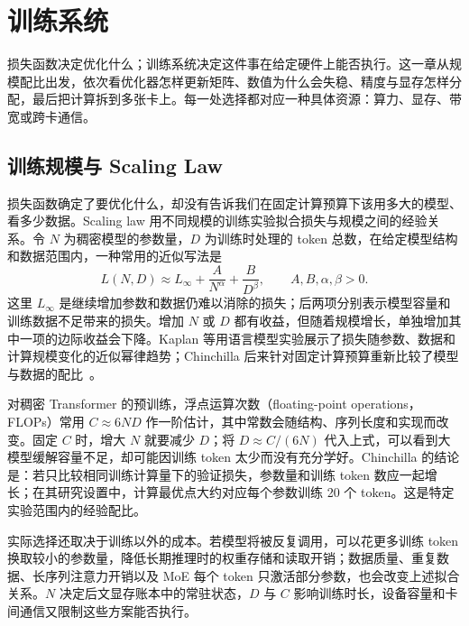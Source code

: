 \chapter{训练系统}
\label{chap:training-stability}

\begin{keybox}
损失函数决定优化什么；训练系统决定这件事在给定硬件上能否执行。这一章从规模配比出发，依次看优化器怎样更新矩阵、数值为什么会失稳、精度与显存怎样分配，最后把计算拆到多张卡上。每一处选择都对应一种具体资源：算力、显存、带宽或跨卡通信。
\end{keybox}

\section{训练规模与 Scaling Law}
\label{sec:training-scaling}

损失函数确定了要优化什么，却没有告诉我们在固定计算预算下该用多大的模型、看多少数据。Scaling law 用不同规模的训练实验拟合损失与规模之间的经验关系。令 \(N\) 为稠密模型的参数量，\(D\) 为训练时处理的 token 总数，在给定模型结构和数据范围内，一种常用的近似写法是
\begin{equation}
 L(N,D)\approx L_\infty+\frac{A}{N^\alpha}+\frac{B}{D^\beta},\qquad A,B,\alpha,\beta>0.
\end{equation}
这里 \(L_\infty\) 是继续增加参数和数据仍难以消除的损失；后两项分别表示模型容量和训练数据不足带来的损失。增加 \(N\) 或 \(D\) 都有收益，但随着规模增长，单独增加其中一项的边际收益会下降。Kaplan 等用语言模型实验展示了损失随参数、数据和计算规模变化的近似幂律趋势；Chinchilla 后来针对固定计算预算重新比较了模型与数据的配比~\cite{kaplan2020scaling,hoffmann2022chinchilla}。

对稠密 Transformer 的预训练，浮点运算次数（floating-point operations，FLOPs）常用 \(C\approx6ND\) 作一阶估计，其中常数会随结构、序列长度和实现而改变。固定 \(C\) 时，增大 \(N\) 就要减少 \(D\)；将 \(D\approx C/(6N)\) 代入上式，可以看到大模型缓解容量不足，却可能因训练 token 太少而没有充分学好。Chinchilla 的结论是：若只比较相同训练计算量下的验证损失，参数量和训练 token 数应一起增长；在其研究设置中，计算最优点大约对应每个参数训练 20 个 token。这是特定实验范围内的经验配比。

实际选择还取决于训练以外的成本。若模型将被反复调用，可以花更多训练 token 换取较小的参数量，降低长期推理时的权重存储和读取开销；数据质量、重复数据、长序列注意力开销以及 MoE 每个 token 只激活部分参数，也会改变上述拟合关系。\(N\) 决定后文显存账本中的常驻状态，\(D\) 与 \(C\) 影响训练时长，设备容量和卡间通信又限制这些方案能否执行。

